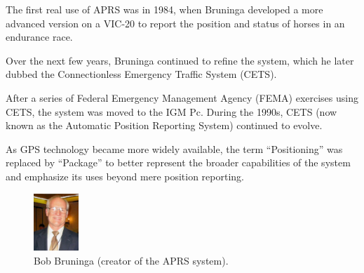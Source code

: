 The first real use of APRS was in 1984, when Bruninga developed a more advanced version on a VIC-20 to report the position and status of horses in an endurance race.

Over the next few years, Bruninga continued to refine the system, which he later dubbed the Connectionless Emergency Traffic System (CETS).

After a series of Federal Emergency Management Agency (FEMA) exercises using CETS, the system was moved to the IGM Pc. During the 1990s, CETS (now known as the Automatic Position Reporting System) continued to evolve.

As GPS technology became more widely available, the term ``Positioning'' was replaced by ``Package'' to better represent the broader capabilities of the system and emphasize its uses beyond mere position reporting.

\begin{figure}[h]
	\centering
	\includegraphics[width=0.15\textwidth]{Imagenes/Chapter_1/bob_bruninga.png}
	\caption{Bob Bruninga (creator of the APRS system).}
	\label{fig:bob-bruninga}
\end{figure}